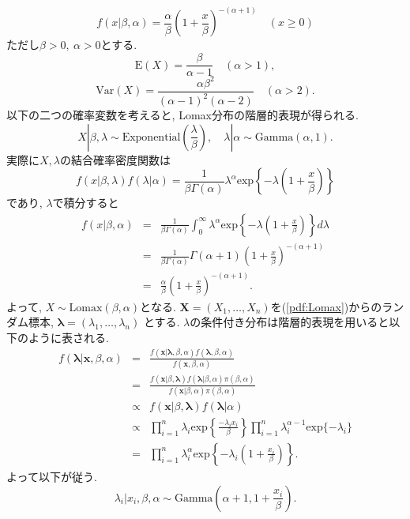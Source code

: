 \documentclass[titlepage,twoside]{jarticle}
\theoremstyle{definition}
\begin{document}
\begin{equation}\label{pdf:Lomax}
f(x|\beta ,\alpha )
=
\frac{\alpha}{\beta }
\left( 
1+\frac{x}{\beta }
\right)
^{-(\alpha +1)}
\quad(x \geq 0)
\end{equation}
ただし$\beta > 0,~\alpha > 0$とする.
$$
\mbox{E}(X) = \frac{\beta }{\alpha -1}\quad (\alpha >1), 
$$
$$
\mbox{Var}(X) = \frac{\alpha \beta ^{2}}{(\alpha -1)^{2}(\alpha -2)}\quad (\alpha >2). 
$$
以下の二つの確率変数を考えると, Lomax分布の階層的表現が得られる.
$$
X|\beta, \lambda \sim \mbox{Exponential} \left(\frac{\lambda }{\beta }\right),\quad
\lambda |\alpha \sim \mbox{Gamma}(\alpha ,1). 
$$
実際に$X,\lambda $の結合確率密度関数は
$$
f(x|\beta ,\lambda )f(\lambda |\alpha )
=
\frac{1}{\beta \Gamma (\alpha )}\lambda ^{\alpha }\mbox{exp}
\left
\{-\lambda 
\left(1+\frac{x}{\beta }\right)
\right\} 
$$
であり, $\lambda $で積分すると
\begin{eqnarray*}
f(x|\beta ,\alpha )
&=&
\frac{1}{\beta \Gamma (\alpha )}\int_{0}^{\infty }
\lambda ^{\alpha }\mbox{exp}
\left\{
-\lambda \left(1+\frac{x}{\beta }\right)
\right\}d\lambda \\
&=&
\frac{1}{\beta \Gamma (\alpha )}\Gamma(\alpha +1)
\left (1+\frac{x}{\beta }\right)^{-(\alpha +1)} \\
&=&
\frac{\alpha }{\beta }
\left(1+\frac{x}{\beta }\right)^{-(\alpha +1)}.
\end{eqnarray*}
よって, $X \sim \mbox{Lomax}(\beta ,\alpha )となる.$
$\bm{X}=(X_{1},\ldots,X_{n})$を(\ref{pdf:Lomax})からのランダム標本, $\bm{\lambda }=(\lambda_{1},\ldots,\lambda_{n})$
とする. $\lambda $の条件付き分布は階層的表現を用いると以下のように表される.
\begin{eqnarray*}
f(\bm{\lambda }|\bm{x},\beta ,\alpha )
&=&
\frac{f(\bm{x}|\bm{\lambda },\beta ,\alpha )f(\bm{\lambda },\beta ,\alpha )}
{f(\bm{x},\beta ,\alpha )} \\
&=&
\frac{f(\bm{x}|\beta ,\bm{\lambda })f(\bm{\lambda }|\beta ,\alpha )\pi(\beta ,\alpha )}
{f(\bm{x}|\beta ,\alpha )\pi(\beta ,\alpha )} \\
&\propto&
f(\bm{x}|\beta ,\bm{\lambda })f(\bm{\lambda }|\alpha ) \\
&\propto&
\prod_{i=1}^{n}\lambda _{i}\mbox{exp}\left\{\frac{-\lambda _{i}x_{i}}{\beta }\right\}
\prod_{i=1}^{n}\lambda _{i}^{\alpha -1}\mbox{exp}\{-\lambda _{i}\} \\
&=&
\prod_{i=1}^{n}\lambda _{i}^{\alpha }\mbox{exp}\left\{
-\lambda _{i}\left(1+\frac{x_{i}}{\beta }\right)
\right\}.
\end{eqnarray*}
よって以下が従う.
$$
\lambda _{i}|x_i,\beta ,\alpha 
\sim 
\mbox{Gamma} \left(\alpha +1,1+\frac{x_{i}}{\beta }\right). 
$$
\end{document}
